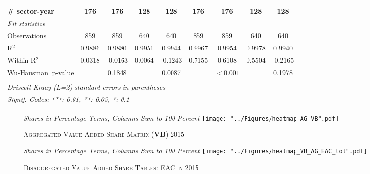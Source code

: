 \documentclass[a4paper]{article}
\begin{document}
\begin{table}[h!]
{\begin{tabular}{lcccccccc}
      \# sector-year                                 & 176            & 176           & 128           & 128                    & 176            & 176                   & 128            & 128\\ 
            \midrule
      \emph{Fit statistics}\\
      Observations                                   & 859            & 859           & 640           & 640                    & 859            & 859                   & 640            & 640\\  
      R$^2$                                          & 0.9886         & 0.9880        & 0.9951        & 0.9944                 & 0.9967         & 0.9954                & 0.9978         & 0.9940\\  
      Within R$^2$                                   & 0.0318         & -0.0163       & 0.0064        & -0.1243                & 0.7155         & 0.6108                & 0.5504         & -0.2165\\  
      Wu-Hausman, p-value                            &                & 0.1848        &               & 0.0087                 &                & $<0.001$  &                & 0.1978\\ 
      \bottomrule \\ [-0.9em]
      \multicolumn{9}{l}{\emph{Driscoll-Kraay (L=2) standard-errors in parentheses}}\\
      \multicolumn{9}{l}{\emph{Signif. Codes: ***: 0.01, **: 0.05, *: 0.1}}\\
   \end{tabular}
   }
\end{table}
\FloatBarrier










\begin{figure}[h!] \vspace{-7mm}
\centering
\caption{\label{fig:wldVB}\textsc{Aggregated Value Added Share Matrix (\textbf{VB}) 2015}}
\small{\textit{Shares in Percentage Terms, Columns Sum to 100 Percent}}
\texttt{[image: "../Figures/heatmap\_AG\_VB".pdf]} %
\vspace{-30mm}
\end{figure}
\FloatBarrier

\begin{figure}[h!]
\centering
\caption{\label{fig:eacVB}\textsc{Disaggregated Value Added Share Tables: EAC in 2015}}
\small{\textit{Shares in Percentage Terms, Columns Sum to 100 Percent}}
\texttt{[image: "../Figures/heatmap\_VB\_AG\_EAC\_tot".pdf]} %
\end{figure}
\FloatBarrier
\end{document}
